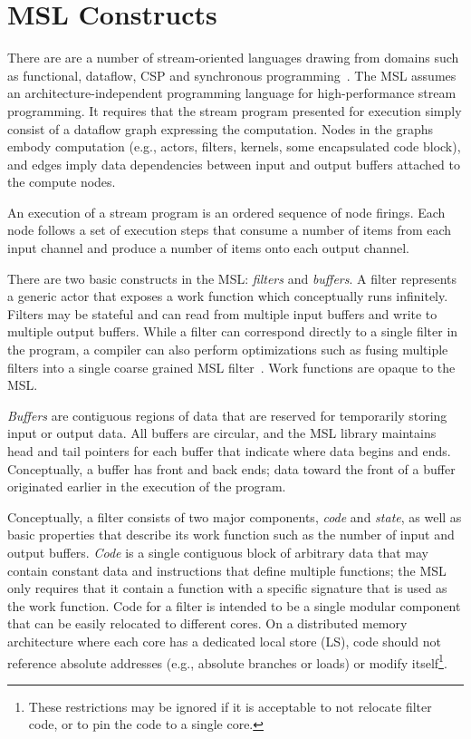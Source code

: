 \section{MSL Constructs}

There are are a number of stream-oriented languages drawing from
domains such as functional, dataflow, CSP and synchronous
programming~\cite{survey97}. The MSL assumes an
architecture-independent programming language for high-performance
stream programming. It requires that the stream program presented for
execution simply consist of a dataflow graph expressing the
computation. Nodes in the graphs embody computation (e.g., actors,
filters, kernels, some encapsulated code block), and edges imply data
dependencies between input and output buffers attached to the compute
nodes.

An execution of a stream program is an ordered sequence of node
firings. Each node follows a set of execution steps that consume a
number of items from each input channel and produce a number of items
onto each output channel.

There are two basic constructs in the MSL: \emph{filters} and
\emph{buffers}. A filter represents a generic actor that exposes a
work function which conceptually runs infinitely. Filters may be
stateful and can read from multiple input buffers and write to multiple
output buffers. While a filter can correspond directly to a
single filter in the program, a compiler can also perform
optimizations such as fusing multiple filters into a single
coarse grained MSL filter~\cite{asplos02}. Work functions are opaque to the MSL.

\emph{Buffers} are contiguous regions of data that are reserved for
temporarily storing input or output data. All buffers are circular,
and the MSL library maintains head and tail pointers for each buffer
that indicate where data begins and ends. Conceptually, a buffer has
front and back ends; data toward the front of a buffer originated
earlier in the execution of the program.

Conceptually, a filter consists of two major components, \emph{code}
and \emph{state}, as well as basic properties that describe its work
function such as the number of input and output buffers. \emph{Code}
is a single contiguous block of arbitrary data that may contain
constant data and instructions that define multiple functions; the MSL
only requires that it contain a function with a specific signature
that is used as the work function. Code for a filter is intended to be
a single modular component that can be easily relocated to different
cores. On a distributed memory architecture where each core has a
dedicated local store (LS), code should not reference absolute
addresses (e.g., absolute branches or loads) or modify
itself\footnote{These restrictions may be ignored if it is acceptable
to not relocate filter code, or to pin the code to a single core.}.

